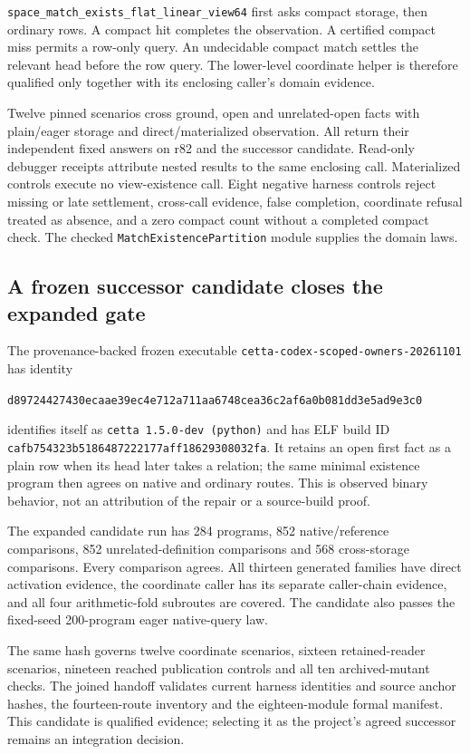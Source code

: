 \documentclass[11pt,a4paper]{article}
\newcommand{\code}[1]{\nolinkurl{#1}}
\begin{document}
\code{space_match_exists_flat_linear_view64} first asks compact storage, then
ordinary rows. A compact hit completes the observation. A certified compact
miss permits a row-only query. An undecidable compact match settles the
relevant head before the row query. The lower-level coordinate helper is
therefore qualified only together with its enclosing caller's domain evidence.

Twelve pinned scenarios cross ground, open and unrelated-open facts with
plain/eager storage and direct/materialized observation. All return their
independent fixed answers on r82 and the successor candidate. Read-only
debugger receipts attribute nested results to the same enclosing call.
Materialized controls execute no view-existence call. Eight negative harness
controls reject missing or late settlement, cross-call evidence, false
completion, coordinate refusal treated as absence, and a zero compact count
without a completed compact check. The checked
\code{MatchExistencePartition} module supplies the domain laws.

\subsection{A frozen successor candidate closes the expanded gate}

The provenance-backed frozen executable \code{cetta-codex-scoped-owners-20261101}
has identity
\begin{center}\small
\code{d89724427430ecaae39ec4e712a711aa6748cea36c2af6a0b081dd3e5ad9e3c0}
\end{center}
identifies itself as \code{cetta 1.5.0-dev (python)} and has ELF build ID
\code{cafb754323b5186487222177aff18629308032fa}. It retains an open first
fact as a plain row when its head later takes a relation; the same minimal
existence program then agrees on native and ordinary routes. This is observed
binary behavior, not an attribution of the repair or a source-build proof.

The expanded candidate run has 284 programs, 852 native/reference
comparisons, 852 unrelated-definition comparisons and 568 cross-storage
comparisons. Every comparison agrees. All thirteen generated families have
direct activation evidence, the coordinate caller has its separate caller-chain
evidence, and all four arithmetic-fold subroutes are covered. The candidate
also passes the fixed-seed 200-program eager native-query law.

The same hash governs twelve coordinate scenarios, sixteen retained-reader
scenarios, nineteen reached publication controls and all ten archived-mutant
checks. The joined handoff validates current harness identities and source
anchor hashes, the fourteen-route inventory and the eighteen-module formal
manifest. This candidate is qualified evidence; selecting it as the project's
agreed successor remains an integration decision.
\end{document}
